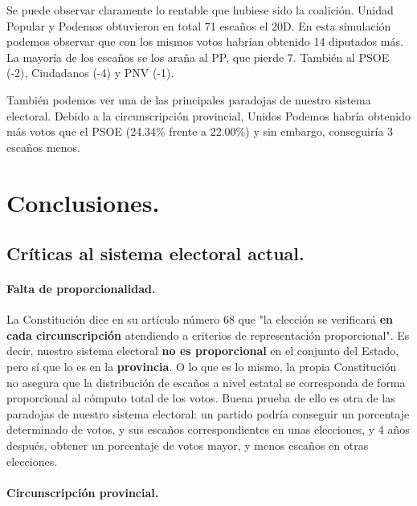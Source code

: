 \documentclass[11pt]{article}
\begin{document}
	Se puede observar claramente lo rentable que hubiese sido la coalición. Unidad Popular y Podemos obtuvieron en total 71 escaños el 20D. En esta simulación podemos observar que con los mismos votos habrían obtenido 14 diputados más. La mayoría de los escaños se los araña al PP, que pierde 7. También al PSOE (-2), Ciudadanos (-4) y PNV (-1).
	
	También podemos ver una de las principales paradojas de nuestro sistema electoral. Debido a la circunscripción provincial, Unidos Podemos habría obtenido más votos que el PSOE (24.34\% frente a 22.00\%) y sin embargo, conseguiría 3 escaños menos.

	\section{Conclusiones.}
	
	\subsection{Críticas al sistema electoral actual.}
	
	\paragraph{Falta de proporcionalidad.}
	
	La Constitución dice en su artículo número 68 que "la elección se verificará \textbf{en cada circunscripción} atendiendo a criterios de representación proporcional". Es decir, nuestro sistema electoral \textbf{no es proporcional} en el conjunto del Estado, pero sí que lo es en la \textbf{provincia}. O lo que es lo mismo, la propia Constitución no asegura que la distribución de escaños a nivel estatal se corresponda de forma proporcional al cómputo total de los votos. Buena prueba de ello es otra de las paradojas de nuestro sistema electoral: un partido podría conseguir un porcentaje determinado de votos, y sus escaños correspondientes en unas elecciones, y 4 años después, obtener un porcentaje de votos mayor, y menos escaños en otras elecciones.
	
	\paragraph{Circunscripción provincial.}
	
\end{document}

